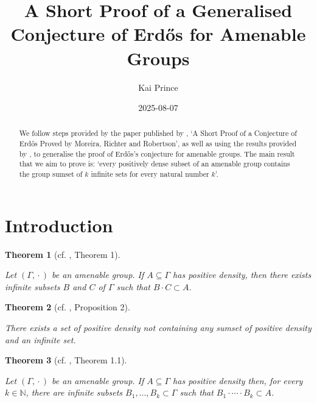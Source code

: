 \documentclass[
  british,
]{article}
\title{A Short Proof of a Generalised Conjecture of Erdős for Amenable
Groups}
\author{Kai Prince}
\date{2025-08-07}
\renewcommand*\contentsname{Table of contents}
\newcommand\contentsname{Table of contents}
\theoremstyle{plain}
\theoremstyle{definition}
\theoremstyle{plain}
\newtheorem{theorem}{Theorem}[section]
\theoremstyle{remark}
\newcommand{\AmenableGroup}{{\Gamma}}
\newcommand{\N}{\mathbb{N}}
\newcommand{\GroupOperation}[2]{{#1}\cdot{#2}}
\begin{document}
\maketitle
\begin{abstract}
We follow steps provided by the paper published by
, `A Short Proof of a
Conjecture of Erdős Proved by Moreira, Richter and Robertson', as well
as using the results provided by , to generalise the proof of Erdős's conjecture for amenable
groups. The main result that we aim to prove is: `every positively dense
subset of an amenable group contains the group sumset of \(k\) infinite
sets for every natural number \(k\)'.
\end{abstract}

\renewcommand*\contentsname{Table of contents}
{
\hypersetup{linkcolor=}
\setcounter{tocdepth}{3}
\tableofcontents
}

\section{Introduction}\label{introduction}

\begin{theorem}[cf. , Theorem
1]\protect\hypertarget{thm-GenErdosConjComb}{}\label{thm-GenErdosConjComb}

Let \((\AmenableGroup,\GroupOperation{}{})\) be an amenable group. If
\(A\subseteq\AmenableGroup\) has positive density, then there exists
infinite subsets \(B\) and \(C\) of \(\AmenableGroup\) such that
\(\GroupOperation{B}{C}\subset A\).

\end{theorem}

\begin{theorem}[cf. ,
Proposition
2]\protect\hypertarget{thm-GenErdosConjRel}{}\label{thm-GenErdosConjRel}

There exists a set of positive density not containing any sumset of
positive density and an infinite set.

\end{theorem}

\begin{theorem}[cf. ,
Theorem
1.1]\protect\hypertarget{thm-GenNErdosConjComb}{}\label{thm-GenNErdosConjComb}

Let \((\AmenableGroup,\GroupOperation{}{})\) be an amenable group. If
\(A\subseteq\AmenableGroup\) has positive density then, for every
\(k\in\N\), there are infinite subsets
\(B_1,...,B_k\subset\AmenableGroup\) such that
\(B_1\cdot\cdots\cdot B_k\subset A\).

\end{theorem}
\end{document}
